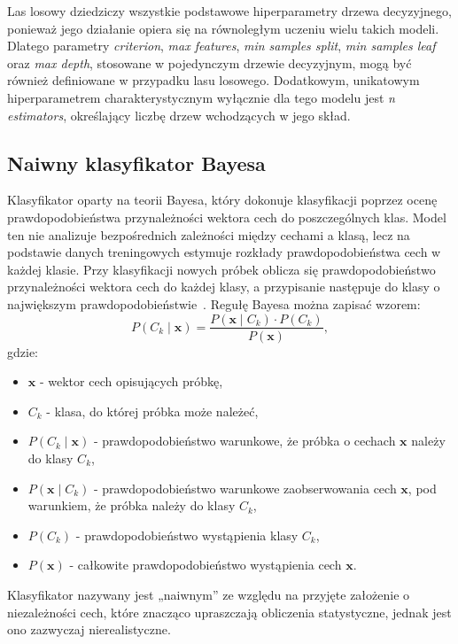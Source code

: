 \documentclass[a4paper,twoside,12pt]{book}
\begin{document}
Las losowy dziedziczy wszystkie podstawowe hiperparametry drzewa decyzyjnego, ponieważ jego działanie opiera się na równoległym uczeniu wielu takich modeli. Dlatego parametry \textit{criterion}, \textit{max features}, \textit{min samples split}, \textit{min samples leaf} oraz \textit{max depth}, stosowane w pojedynczym drzewie decyzyjnym, mogą być również definiowane w przypadku lasu losowego. Dodatkowym, unikatowym hiperparametrem charakterystycznym wyłącznie dla tego modelu jest \textit{n estimators}, określający liczbę drzew wchodzących w jego skład.

\subsection*{Naiwny klasyfikator Bayesa}
Klasyfikator oparty na teorii Bayesa, który dokonuje klasyfikacji poprzez ocenę prawdopodobieństwa przynależności wektora cech do poszczególnych klas. Model ten nie analizuje bezpośrednich zależności między cechami a klasą, lecz na podstawie danych treningowych estymuje rozkłady prawdopodobieństwa cech w każdej klasie. Przy klasyfikacji nowych próbek oblicza się prawdopodobieństwo przynależności wektora cech do każdej klasy, a przypisanie następuje do klasy o największym prawdopodobieństwie~\cite{Majumdar2023}. Regułę Bayesa można zapisać wzorem:
\begin{equation}
	P(C_k \mid \mathbf{x}) = \frac{P(\mathbf{x} \mid C_k) \cdot P(C_k)}{P(\mathbf{x})},
\end{equation}
\newpage
\noindent gdzie:
\begin{itemize}
	\item $\mathbf{x}$ - wektor cech opisujących próbkę,
	\item $C_k$ - klasa, do której próbka może należeć,
	\item $P(C_k \mid \mathbf{x})$ - prawdopodobieństwo warunkowe, że próbka o cechach $\mathbf{x}$ należy do klasy $C_k$,
	\item $P(\mathbf{x} \mid C_k)$ - prawdopodobieństwo warunkowe zaobserwowania cech $\mathbf{x}$, pod warunkiem, że próbka należy do klasy $C_k$,
	\item $P(C_k)$ - prawdopodobieństwo wystąpienia klasy $C_k$,
	\item $P(\mathbf{x})$ - całkowite prawdopodobieństwo wystąpienia cech $\mathbf{x}$.
\end{itemize}

Klasyfikator nazywany jest „naiwnym” ze względu na przyjęte założenie o niezależności cech, które znacząco upraszczają obliczenia statystyczne, jednak jest ono zazwyczaj nierealistyczne.
\end{document}
